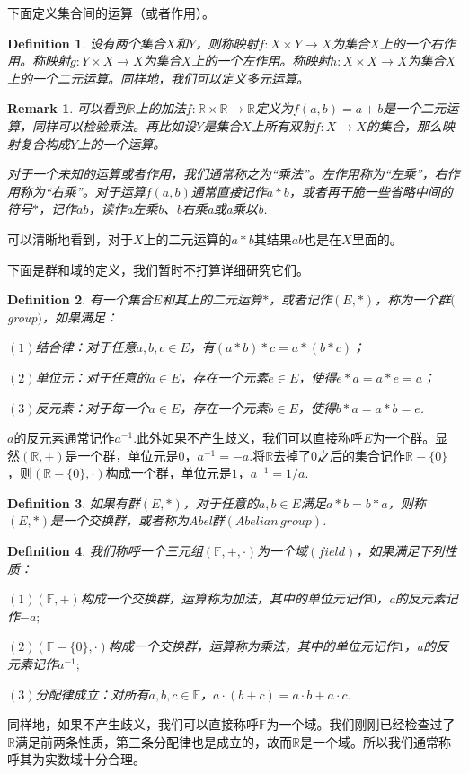 \documentclass[11pt,a4paper,openany]{book}%
\theoremstyle{plain}%
\newtheorem*{rem}{Remark}%
\newtheorem{defi}{Definition}[chapter]%
\newcommand{\NO}[1]{{$(#1)$}}%
\begin{document}
下面定义集合间的运算（或者作用）。
\begin{defi}设有两个集合$X$和$Y$，则称映射$f:X\times Y \rightarrow X$为集合$X$上的一个右作用。称映射$g:Y\times X \rightarrow X$为集合$X$上的一个左作用。称映射$h:X\times X \rightarrow X$为集合$X$上的一个二元运算。同样地，我们可以定义多元运算。
\end{defi}
\begin{rem}
可以看到$\mathbb{R}$上的加法$f:\mathbb{R}\times \mathbb{R} \rightarrow \mathbb{R}$定义为$f(a,b)=a+b$是一个二元运算，同样可以检验乘法。再比如设$Y$是集合$X$上所有双射$f:X\rightarrow X$的集合，那么映射复合构成$Y$上的一个运算。

对于一个未知的运算或者作用，我们通常称之为“乘法”。左作用称为“左乘”，右作用称为“右乘”。对于运算$f(a,b)$通常直接记作$a*b$，或者再干脆一些省略中间的符号$*$，记作$ab$，读作a左乘b、b右乘a或a乘以b.
\end{rem}
可以清晰地看到，对于$X$上的二元运算的$a*b$其结果$ab$也是在$X$里面的。

下面是群和域的定义，我们暂时不打算详细研究它们。
\begin{defi}有一个集合$E$和其上的二元运算$*$，或者记作$(E,*)$，称为一个群$($group$)$，如果满足：

\NO{1}结合律：对于任意$a,b,c\in E$，有$(a*b)*c=a*(b*c)$；

\NO{2}单位元：对于任意的$a\in E$，存在一个元素$e\in E$，使得$e*a=a*e=a$；

\NO{3}反元素：对于每一个$a\in E$，存在一个元素$b\in E$，使得$b*a=a*b=e$.
\end{defi}
$a$的反元素通常记作$a^{-1}$.此外如果不产生歧义，我们可以直接称呼$E$为一个群。显然$(\mathbb{R},+)$是一个群，单位元是0，$a^{-1}=-a$.将$\mathbb{R}$去掉了$0$之后的集合记作$\mathbb{R}-\{0\}$，则$(\mathbb{R}-\{0\},\cdot)$构成一个群，单位元是$1$，$a^{-1}=1/a$.
\begin{defi}
如果有群$(E,*)$，对于任意的$a,b\in E$满足$a*b=b*a$，则称$(E,*)$是一个交换群，或者称为{\rm Abel}群$(Abelian\,group)$.
\end{defi}
\begin{defi}
我们称呼一个三元组$(\mathbb{F},+,\cdot)$为一个域$(field)$，如果满足下列性质：

\NO{1}$(\mathbb{F},+)$构成一个交换群，运算称为加法，其中的单位元记作$0$，a的反元素记作$-a;$

\NO{2}$(\mathbb{F}-\{0\},\cdot)$构成一个交换群，运算称为乘法，其中的单位元记作$1$，a的反元素记作$a^{-1};$

\NO{3}分配律成立：对所有$a,b,c \in \mathbb{F}$，$a\cdot(b+c)=a\cdot b+a\cdot c$.
\end{defi}
同样地，如果不产生歧义，我们可以直接称呼$\mathbb{F}$为一个域。我们刚刚已经检查过了$\mathbb{R}$满足前两条性质，第三条分配律也是成立的，故而$\mathbb{R}$是一个域。所以我们通常称呼其为实数域十分合理。
\end{document}

